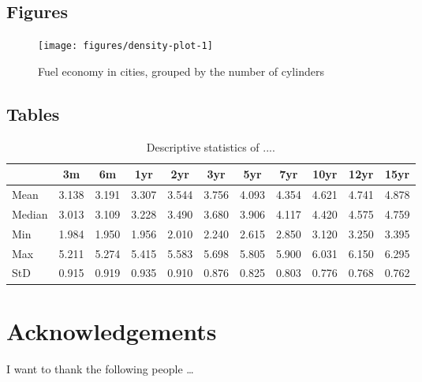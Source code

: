\documentclass[a4paper,12pt]{article}
\begin{document}
\hypertarget{figures-1}{%
\subsection{Figures}\label{figures-1}}
\begin{figure}

{\centering \texttt{[image: figures/density-plot-1]} 

}

\caption{Fuel economy in cities, grouped by the number of cylinders}\label{fig:density-plot}
\end{figure}
\hypertarget{tables-1}{%
\subsection{Tables}\label{tables-1}}
\begin{table}[ht]
    \caption{Descriptive statistics of .... }
    \label{tab:apptable}
    \begin{center}
        {\footnotesize
        \begin{tabular}{l|cccccccccc}
        \hline \hline
                        & 3m    & 6m    & 1yr   & 2yr   & 3yr   & 5yr   & 7yr   & 10yr  & 12yr  & 15yr   \\
            \hline
                Mean   & 3.138 & 3.191 & 3.307 & 3.544 & 3.756 & 4.093 & 4.354 & 4.621 & 4.741 & 4.878  \\
                Median & 3.013 & 3.109 & 3.228 & 3.490 & 3.680 & 3.906 & 4.117 & 4.420 & 4.575 & 4.759  \\
                Min    & 1.984 & 1.950 & 1.956 & 2.010 & 2.240 & 2.615 & 2.850 & 3.120 & 3.250 & 3.395  \\
                Max    & 5.211 & 5.274 & 5.415 & 5.583 & 5.698 & 5.805 & 5.900 & 6.031 & 6.150 & 6.295  \\
                StD    & 0.915 & 0.919 & 0.935 & 0.910 & 0.876 & 0.825 & 0.803 & 0.776 & 0.768 & 0.762  \\
            \hline \hline
        \end{tabular}}
    \end{center}
\end{table}
\newpage

\hypertarget{acknowledgements}{%
\section{Acknowledgements}\label{acknowledgements}}

I want to thank the following people \ldots{}
\end{document}

